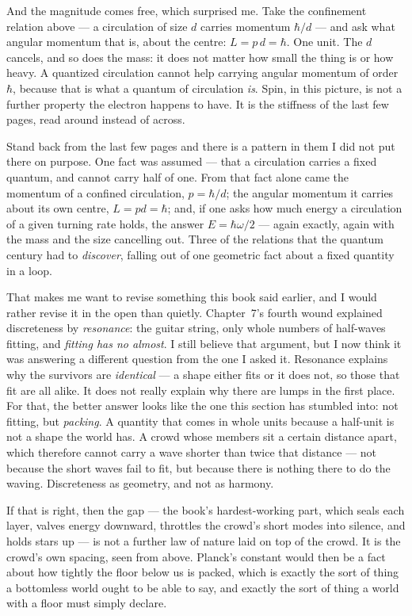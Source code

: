 \documentclass[fontsize=11pt,paper=a4,pagesize=auto,parskip=half-]{scrbook}
\begin{document}
And the magnitude comes free, which surprised me. Take the confinement relation above --- a circulation of size $d$ carries momentum $\hbar/d$ --- and ask what angular momentum that is, about the centre: $L = p\,d = \hbar$. One unit. The $d$ cancels, and so does the mass: it does not matter how small the thing is or how heavy. A quantized circulation cannot help carrying angular momentum of order $\hbar$, because that is what a quantum of circulation \emph{is}. Spin, in this picture, is not a further property the electron happens to have. It is the stiffness of the last few pages, read around instead of across.

Stand back from the last few pages and there is a pattern in them I did not put there on purpose. One fact was assumed --- that a circulation carries a fixed quantum, and cannot carry half of one. From that fact alone came the momentum of a confined circulation, $p = \hbar/d$; the angular momentum it carries about its own centre, $L = pd = \hbar$; and, if one asks how much energy a circulation of a given turning rate holds, the answer $E = \hbar\omega/2$ --- again exactly, again with the mass and the size cancelling out. Three of the relations that the quantum century had to \emph{discover}, falling out of one geometric fact about a fixed quantity in a loop.

That makes me want to revise something this book said earlier, and I would rather revise it in the open than quietly. Chapter~7's fourth wound explained discreteness by \emph{resonance}: the guitar string, only whole numbers of half-waves fitting, and \emph{fitting has no almost}. I still believe that argument, but I now think it was answering a different question from the one I asked it. Resonance explains why the survivors are \emph{identical} --- a shape either fits or it does not, so those that fit are all alike. It does not really explain why there are lumps in the first place. For that, the better answer looks like the one this section has stumbled into: not fitting, but \emph{packing}. A quantity that comes in whole units because a half-unit is not a shape the world has. A crowd whose members sit a certain distance apart, which therefore cannot carry a wave shorter than twice that distance --- not because the short waves fail to fit, but because there is nothing there to do the waving. Discreteness as geometry, and not as harmony.

If that is right, then the gap --- the book's hardest-working part, which seals each layer, valves energy downward, throttles the crowd's short modes into silence, and holds stars up --- is not a further law of nature laid on top of the crowd. It is the crowd's own spacing, seen from above. Planck's constant would then be a fact about how tightly the floor below us is packed, which is exactly the sort of thing a bottomless world ought to be able to say, and exactly the sort of thing a world with a floor must simply declare.
\end{document}
